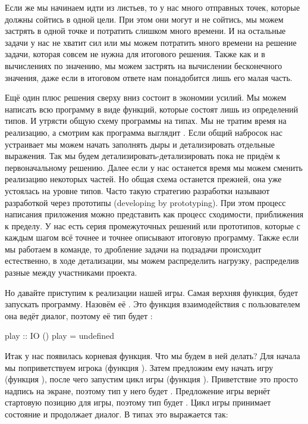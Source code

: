 

Если же мы начинаем идти из листьев, то у нас много отправных
точек, которые должны сойтись в одной цели. При этом они
могут и не сойтись, мы можем застрять в одной точке и потратить
слишком много времени. И на остальные задачи у нас не хватит
сил или мы можем потратить много времени на решение задачи,
которая совсем не нужна для итогового решения. Также как и в 
вычислениях по значению, мы можем застрять на вычислении 
бесконечного значения, даже если в итоговом ответе нам понадобится
лишь его малая часть. 

Ещё один плюс решения сверху вниз состоит в экономии усилий.
Мы можем написать всю программу в виде функций, которые 
состоят лишь из определений типов. И утрясти общую схему
программы на типах. Мы не тратим время на реализацию, а смотрим как
программа выглядит . Если общий набросок нас устраивает
мы можем начать заполнять дыры и детализировать отдельные
выражения. Так мы будем детализировать-детализировать 
пока не придём к первоначальному решению. Далее если у нас
останется время мы можем сменить реализацию некоторых частей. 
Но общая схема останется прежней, она уже устоялась на уровне
типов. Часто такую стратегию разработки называют разработкой
через прототипы (developing by prototyping). При этом процесс
написания приложения можно представить как процесс сходимости,
приближения к пределу. У нас есть серия промежуточных решений
или прототипов, которые с каждым шагом всё точнее и точнее
описывают итоговую программу. 
Также если мы работаем в команде, то дробление
задачи на подзадачи происходит естественно, в ходе детализации, 
мы можем распределить нагрузку, распределив разные 
между участниками проекта.


Но давайте приступим к реализации нашей игры. Самая
верхняя функция, будет запускать программу. Назовём её
. Это функция взаимодействия с пользователем 
она ведёт диалог, поэтому её тип будет \mbox{}:

\begin{code}
play :: IO ()
play = undefined
\end{code}

Итак у нас появилась корневая функция. Что мы будем
в ней делать? Для начала мы поприветствуем игрока
(функция ). Затем предложим ему начать игру
(функция ), после чего 
запустим цикл игры (функция ). Приветствие это просто надпись
на экране, поэтому тип у него будет . 
Предложение игры вернёт стартовую позицию для игры,
поэтому тип будет . Цикл игры принимает
состояние и продолжает диалог. В типах это выражается
так:

